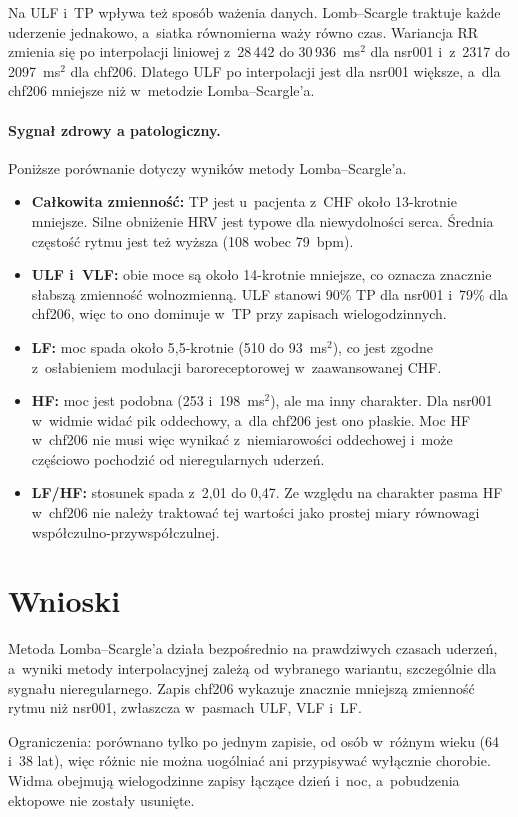 \documentclass[11pt,a4paper]{article}
\begin{document}
Na ULF i~TP wpływa też sposób ważenia danych. Lomb--Scargle traktuje każde uderzenie jednakowo, a~siatka równomierna waży równo czas. Wariancja RR zmienia się po interpolacji liniowej z~28\,442 do 30\,936~ms$^2$ dla nsr001 i~z~2317 do 2097~ms$^2$ dla chf206. Dlatego ULF po interpolacji jest dla nsr001 większe, a~dla chf206 mniejsze niż w~metodzie Lomba--Scargle'a.

\paragraph{Sygnał zdrowy a patologiczny.} Poniższe porównanie dotyczy wyników metody Lomba--Scargle'a.
\begin{itemize}
  \item \textbf{Całkowita zmienność:} TP jest u~pacjenta z~CHF około 13-krotnie mniejsze. Silne obniżenie HRV jest typowe dla niewydolności serca. Średnia częstość rytmu jest też wyższa (108 wobec 79~bpm).
  \item \textbf{ULF i~VLF:} obie moce są około 14-krotnie mniejsze, co oznacza znacznie słabszą zmienność wolnozmienną. ULF stanowi 90\% TP dla nsr001 i~79\% dla chf206, więc to ono dominuje w~TP przy zapisach wielogodzinnych.
  \item \textbf{LF:} moc spada około 5,5-krotnie (510 do 93~ms$^2$), co jest zgodne z~osłabieniem modulacji baroreceptorowej w~zaawansowanej CHF.
  \item \textbf{HF:} moc jest podobna (253 i~198~ms$^2$), ale ma inny charakter. Dla nsr001 w~widmie widać pik oddechowy, a~dla chf206 jest ono płaskie. Moc HF w~chf206 nie musi więc wynikać z~niemiarowości oddechowej i~może częściowo pochodzić od nieregularnych uderzeń.
  \item \textbf{LF/HF:} stosunek spada z~2,01 do 0,47. Ze względu na charakter pasma HF w~chf206 nie należy traktować tej wartości jako prostej miary równowagi współczulno-przywspółczulnej.
\end{itemize}

\section{Wnioski}
Metoda Lomba--Scargle'a działa bezpośrednio na prawdziwych czasach uderzeń, a~wyniki metody interpolacyjnej zależą od wybranego wariantu, szczególnie dla sygnału nieregularnego. Zapis chf206 wykazuje znacznie mniejszą zmienność rytmu niż nsr001, zwłaszcza w~pasmach ULF, VLF i~LF.

Ograniczenia: porównano tylko po jednym zapisie, od osób w~różnym wieku (64 i~38 lat), więc różnic nie można uogólniać ani przypisywać wyłącznie chorobie. Widma obejmują wielogodzinne zapisy łączące dzień i~noc, a~pobudzenia ektopowe nie zostały usunięte.
\end{document}
